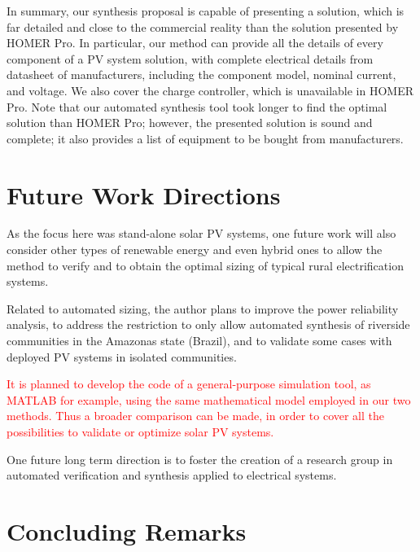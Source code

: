 In summary, our synthesis proposal is capable of presenting a solution, which is far detailed and close to the commercial reality than the solution presented by HOMER Pro. In particular, our method can provide all the details of every component of a PV system solution, with complete electrical details from datasheet of manufacturers, including the component model, nominal current, and voltage. We also cover the charge controller, which is unavailable in HOMER Pro. Note that our automated synthesis tool took longer to find the optimal solution than HOMER Pro; however, the presented solution is sound and complete; it also provides a list of equipment to be bought from manufacturers. %


\section{Future Work Directions}

As the focus here was stand-alone solar PV systems, one future work will also consider other types of renewable energy and even hybrid ones to allow the method to verify and to obtain the optimal sizing of typical rural electrification systems.

Related to automated sizing, the author plans to improve the power reliability analysis, to address the restriction to only allow automated synthesis of riverside communities in the Amazonas state (Brazil), and to validate some cases with deployed PV systems in isolated communities.

\textcolor{red}{It is planned to develop the code of a general-purpose simulation tool, as MATLAB for example, using the same mathematical model employed in our two methods. Thus a broader comparison can be made, in order to cover all the possibilities to validate or optimize solar PV systems.}

One future long term direction is to foster the creation of a research group in automated verification and synthesis applied to electrical systems.

\section{Concluding Remarks}

